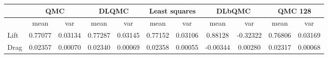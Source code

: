 \begin{tabular}{|l|c|c|c|c|c|c|c|c|c|c|}
\hline
 &\multicolumn{2}{c|}{\textbf{QMC}}&\multicolumn{2}{c|}{\textbf{DLQMC}}&\multicolumn{2}{c|}{\textbf{Least squares}}&\multicolumn{2}{c|}{\textbf{DLbQMC}}&\multicolumn{2}{c|}{\textbf{QMC 128}}\\ 
\hline

 &mean&var&mean&var&mean&var&mean&var&mean&var\\ 
\hline
Lift &0.77077&0.03134&0.77287&0.03145&0.77152&0.03106&0.88128&-0.32322&0.76806&0.03169\\ 
\hline
Drag &0.02357&0.00070&0.02340&0.00069&0.02358&0.00055&-0.00344&0.00280&0.02317&0.00068\\ 
\hline
\end{tabular}

